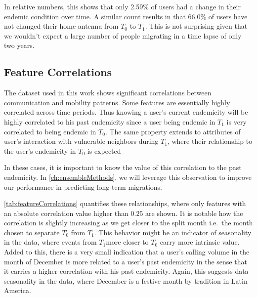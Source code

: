 In relative numbers, this shows that only 2.59\% of users had a change in their endemic condition over time. A similar count results in that 66.0\% of users have not changed their home antenna from $T_0$ to $T_1$. This is not surprising given that we wouldn't expect a large number of people migrating in a time lapse of only two years.



\subsection{Feature Correlations}
\label{subsection:feature_correlations} %


The dataset used in this work shows significant correlations between communication and mobility patterns.
Some features are essentially highly correlated across time periods.
Thus knowing a user's current endemicity will be highly correlated to his past endemicity since a user being endemic in $T_1$ is very correlated to being endemic in $T_0$.
The same property extends to attributes of user's interaction with vulnerable neighbors during $T_1$, where their relationship to the user's endemicity in $T_0$ is expected

In these cases, it is important to know the value of this correlation to the past endemicity.
In \cref{ch:ensembleMethods}, we will leverage this observation to improve our performance in predicting long-term migrations.

\cref{tab:featureCorrelations} quantifies these relationships, where only features with an absolute correlation value higher than $0.25$ are shown.
It is notable how the correlation is slightly increasing as we get closer to the split month i.e.\ the month chosen to separate $T_0$ from $T_1$.
This behavior might be an indicator of seasonality in the data, where events from $T_1$more closer to $T_0$ carry more intrinsic value.
Added to this, there is a very small indication that a user's calling volume in the month of December is more related to a user's past endemicity in the sense that it carries a higher correlation with his past endemicity.
Again, this suggests data seasonality in the data, where December is a festive month by tradition in Latin America.


